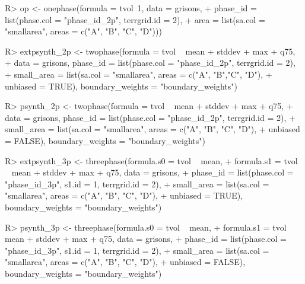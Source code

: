 \documentclass[article]{jss}
\begin{document}
\begin{Schunk}
\begin{Sinput}
R> op <- onephase(formula = tvol~1, data = grisons,
+    phase_id = list(phase.col = "phase_id_2p", terrgrid.id = 2),
+    area = list(sa.col = "smallarea", areas = c("A", "B", "C", "D")))
\end{Sinput}
\end{Schunk}




\begin{Schunk}
\begin{Sinput}
R> extpsynth_2p <- twophase(formula = tvol ~ mean + stddev + max + q75, 
+    data = grisons, phase_id = list(phase.col = "phase_id_2p", terrgrid.id = 2),
+    small_area = list(sa.col = "smallarea", areas = c("A", "B","C", "D"),
+    unbiased = TRUE), boundary_weights = "boundary_weights")
\end{Sinput}
\end{Schunk}



\begin{Schunk}
\begin{Sinput}
R> psynth_2p <- twophase(formula = tvol ~ mean + stddev + max + q75, 
+    data = grisons, phase_id = list(phase.col = "phase_id_2p", terrgrid.id = 2),
+    small_area = list(sa.col = "smallarea", areas = c("A", "B", "C", "D"),
+    unbiased = FALSE), boundary_weights = "boundary_weights")
\end{Sinput}
\end{Schunk}

          

\begin{Schunk}
\begin{Sinput}
R> extpsynth_3p <- threephase(formula.s0 = tvol ~ mean,
+    formula.s1 = tvol ~ mean + stddev + max + q75, data = grisons,
+    phase_id = list(phase.col = "phase_id_3p", s1.id = 1, terrgrid.id = 2),
+    small_area = list(sa.col = "smallarea", areas = c("A", "B", "C", "D"),
+    unbiased = TRUE), boundary_weights = "boundary_weights")
\end{Sinput}
\end{Schunk}



\begin{Schunk}
\begin{Sinput}
R> psynth_3p <- threephase(formula.s0 = tvol ~ mean,
+   formula.s1 = tvol ~ mean + stddev + max + q75, data = grisons,
+   phase_id = list(phase.col = "phase_id_3p", s1.id = 1, terrgrid.id = 2),
+   small_area = list(sa.col = "smallarea", areas = c("A", "B", "C", "D"),
+   unbiased = FALSE), boundary_weights = "boundary_weights")
\end{Sinput}
\end{Schunk}
\end{document}
